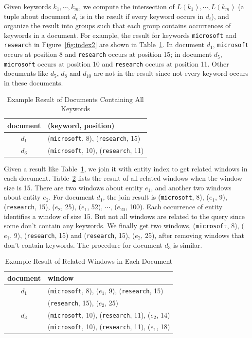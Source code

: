 \documentclass{sig-alternate}
\theoremstyle{definition}
\begin{document}
Given keywords $k_1, \cdots, k_m$, we compute the intersection of $L(k_1), \cdots, L(k_m)$ (a tuple about document $d_i$ is in the result if every keyword occurs in $d_i$), and organize the result into groups such that each group contains occurrences of keywords in a document. For example, the result for keywords {\tt microsoft} and {\tt research} in Figure~\ref{fig:index2} are shown in Table~\ref{tbl:example1}. In document $d_1$, {\tt microsoft} occurs at position 8 and {\tt research} occurs at position 15; in document $d_5$, {\tt microsoft} occurs at position 10 and {\tt research} occurs at position 11. Other documents like $d_5$, $d_8$ and $d_{10}$ are not in the result since not every keyword occurs in these documents.
\begin{table}[htbp]
\center
\begin{tabular}{|c||l|}
  \hline
  document & (keyword, position) \\ \hline \hline
  $d_1$ & ({\tt microsoft}, 8), ({\tt research}, 15)\\ \hline
  $d_3$ & ({\tt microsoft}, 10), ({\tt research}, 11)\\
  \hline
\end{tabular}\caption{Example Result of Documents Containing All Keywords}\label{tbl:example1}
\end{table}

Given a result like Table~\ref{tbl:example1}, we join it with entity index to get related windows in each document. Table~\ref{tbl:example2} lists the result of all related windows when the window size is 15. There are two windows about entity $e_1$, and another two windows about entity $e_2$. For document $d_1$, the join result is ({\tt microsoft}, 8), ($e_1$, 9), ({\tt research}, 15), ($e_2$, 25), ($e_1$, 52), $\cdots$, ($e_{20}$, 100). Each occurrence of entity identifies a window of size 15. But not all windows are related to the query since some don't contain any keywords. We finally get two windows, ({\tt microsoft}, 8), ($e_1$, 9), ({\tt research}, 15) and ({\tt research}, 15), ($e_2$, 25), after removing windows that don't contain keywords. The procedure for document $d_3$ is similar.
\begin{table}[htbp]
\center
\begin{tabular}{|c||l|}
  \hline
  document & window \\ \hline \hline
  $d_1$ & ({\tt microsoft}, 8), ($e_1$, 9), ({\tt research}, 15)\\
        & ({\tt research}, 15), ($e_2$, 25) \\ \hline
  $d_3$ & ({\tt microsoft}, 10), ({\tt research}, 11), ($e_2$, 14)\\
        & ({\tt microsoft}, 10), ({\tt research}, 11), ($e_1$, 18)\\
  \hline
\end{tabular}\caption{Example Result of Related Windows in Each Document}\label{tbl:example2}
\end{table}
\end{document}
